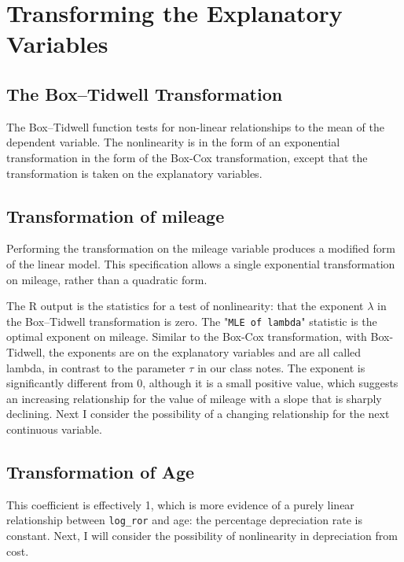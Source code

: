 \documentclass[11pt]{paper}
\begin{document}
\section{Transforming the Explanatory Variables}

\subsection{The Box--Tidwell Transformation}

The Box--Tidwell function tests for non-linear relationships
to the mean of the dependent variable.
The nonlinearity is in the form of an
exponential transformation in the form of the Box-Cox
transformation, except that the transformation is taken
on the explanatory variables.


\subsection{Transformation of mileage}


Performing the transformation on the mileage variable
produces a modified form of the linear model.
This specification allows a single exponential
transformation on mileage, rather than a quadratic form.



The \textsf{R} output is the statistics for a test of nonlinearity:
that the exponent $\lambda$ in the Box--Tidwell transformation is zero.
%
The "\texttt{MLE of lambda}" statistic is the optimal exponent on mileage.
Similar to the Box-Cox transformation,
with Box-Tidwell, the exponents are on the explanatory variables
and are all called lambda, in contrast
to the parameter $\tau$ in our class notes.
The exponent is significantly different from 0,
although it is a small positive value,
which suggests an increasing relationship
for the value of mileage
with a slope that is sharply declining.
Next I consider the possibility of a changing relationship 
for the next continuous variable. 


\subsection{Transformation of Age}




This coefficient is effectively 1, which is more evidence of
a purely linear relationship between \texttt{log\_ror}
and age: the percentage depreciation rate is constant.
Next, I will consider the possibility of nonlinearity 
in depreciation from cost. 
\end{document}
